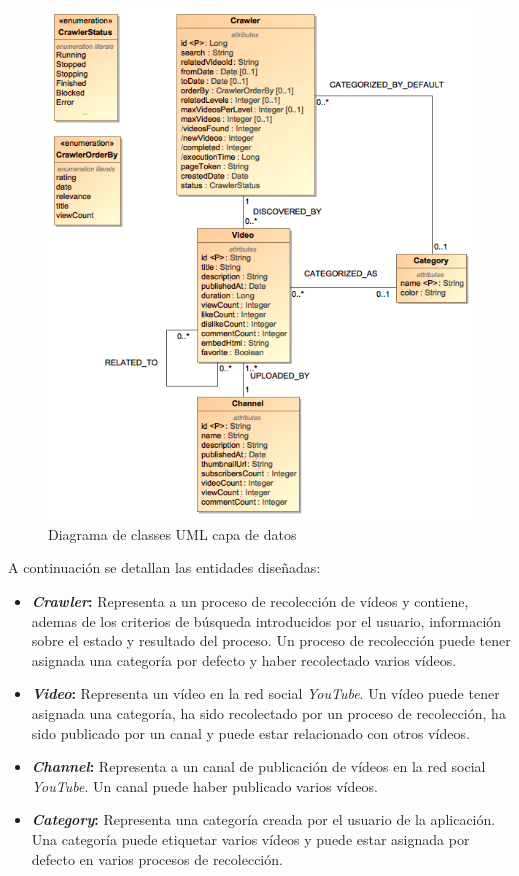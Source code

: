\documentclass[11pt,a4paper]{article}
\begin{document}
\begin{figure}[H]
\centering
\includegraphics[scale=0.6]{diseno/DatabaseUML.png}
\caption{Diagrama de classes UML capa de datos}
\end{figure}

A continuación se detallan las entidades diseñadas:
\begin{itemize}
\item \textbf{\textit{Crawler}:} Representa a un proceso de recolección de vídeos y contiene, ademas de los criterios de búsqueda introducidos por el usuario, información sobre el estado y resultado del proceso. Un proceso de recolección puede tener asignada una categoría por defecto y haber recolectado varios vídeos.
\item \textbf{\textit{Video}:} Representa un vídeo en la red social \textit{YouTube}. Un vídeo puede tener asignada una categoría, ha sido recolectado por un proceso de recolección, ha sido publicado por un canal y puede estar relacionado con otros vídeos.
\item \textbf{\textit{Channel}:} Representa a un canal de publicación de vídeos en la red social \textit{YouTube}. Un canal puede haber publicado varios vídeos.
\item \textbf{\textit{Category}:} Representa una categoría creada por el usuario de la aplicación. Una categoría puede etiquetar varios vídeos y puede estar asignada por defecto en varios procesos de recolección.
\end{itemize}
\end{document}
